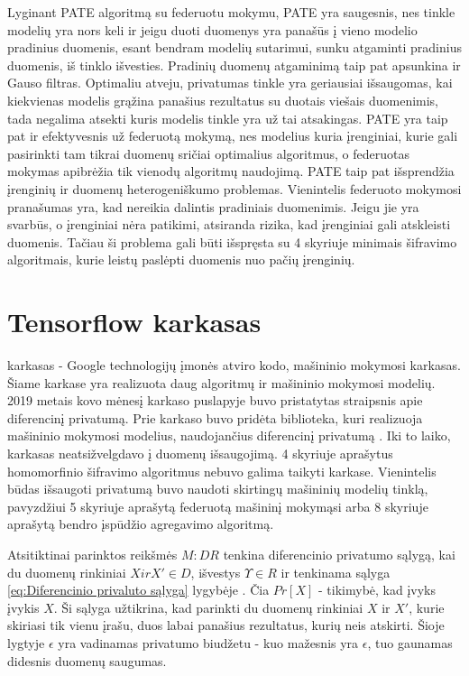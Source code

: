 \documentclass{VUMIFInfBakalaurinis}
\begin{document}
\par Lyginant PATE algoritmą su federuotu mokymu, PATE yra saugesnis, nes tinkle modelių yra nors keli ir jeigu duoti duomenys yra panašūs į vieno modelio pradinius duomenis, esant bendram modelių sutarimui, sunku atgaminti pradinius duomenis, iš tinklo išvesties. Pradinių duomenų atgaminimą taip pat apsunkina ir Gauso filtras. Optimaliu atveju, privatumas tinkle yra geriausiai išsaugomas, kai kiekvienas modelis grąžina panašius rezultatus su duotais viešais duomenimis, tada negalima atsekti kuris modelis tinkle yra už tai atsakingas. PATE yra taip pat ir efektyvesnis už federuotą mokymą, nes modelius kuria įrenginiai, kurie gali pasirinkti tam tikrai duomenų sričiai optimalius algoritmus, o federuotas mokymas apibrėžia tik vienodų algoritmų naudojimą. PATE taip pat išsprendžia įrenginių ir duomenų heterogeniškumo problemas. Vienintelis federuoto mokymosi pranašumas yra, kad nereikia dalintis pradiniais duomenimis. Jeigu jie yra svarbūs, o įrenginiai nėra patikimi, atsiranda rizika, kad įrenginiai gali atskleisti duomenis. Tačiau ši problema gali būti išspręsta su 4 skyriuje minimais šifravimo algoritmais, kurie leistų paslėpti duomenis nuo pačių įrenginių.

\section{Tensorflow karkasas}
\par {} karkasas - Google technologijų įmonės atviro kodo, mašininio mokymosi karkasas. Šiame karkase yra realizuota daug algoritmų ir mašininio mokymosi modelių. 2019 metais kovo mėnesį  karkaso puslapyje buvo pristatytas straipsnis apie diferencinį privatumą. Prie  karkaso buvo pridėta  biblioteka, kuri realizuoja mašininio mokymosi modelius, naudojančius diferencinį privatumą \cite{29}. Iki to laiko,  karkasas neatsižvelgdavo į duomenų išsaugojimą. 4 skyriuje aprašytus homomorfinio šifravimo algoritmus nebuvo galima taikyti karkase. Vienintelis būdas išsaugoti privatumą buvo naudoti skirtingų mašininių modelių tinklą, pavyzdžiui 5 skyriuje aprašytą federuotą mašininį mokymąsi arba 8 skyriuje aprašytą bendro įspūdžio agregavimo algoritmą.
\par Atsitiktinai parinktos reikšmės $M : D $\rightarrow$ R$ tenkina diferencinio privatumo sąlygą, kai du duomenų rinkiniai $X ir X' \in D$, išvestys $\Upsilon \in R$ ir tenkinama sąlyga \eqref{eq:Diferencinio privaluto sąlyga} lygybėje \cite{30}. Čia $Pr[X]$ - tikimybė, kad įvyks įvykis $X$. Ši sąlyga užtikrina, kad parinkti du duomenų rinkiniai $X$ ir $X'$, kurie skiriasi tik vienu įrašu, duos labai panašius rezultatus, kurių neis atskirti. Šioje lygtyje $\epsilon$ yra vadinamas privatumo biudžetu - kuo mažesnis yra $\epsilon$, tuo gaunamas didesnis duomenų saugumas.
\end{document}
